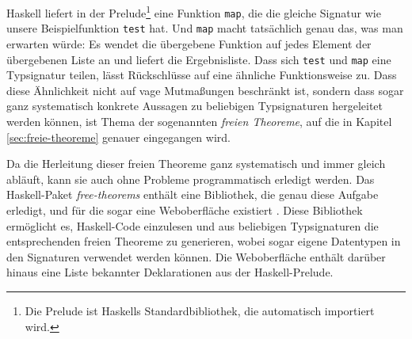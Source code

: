 Haskell liefert in der Prelude\footnote{Die Prelude ist Haskells Standardbibliothek, die automatisch importiert wird\cite{haskell}.}
eine Funktion \texttt{map}, die die gleiche Signatur wie unsere Beispielfunktion \texttt{test} hat. Und \texttt{map} macht tatsächlich genau das, was
man erwarten würde: Es wendet die übergebene Funktion auf jedes Element der übergebenen Liste an und liefert die Ergebnisliste.
Dass sich \texttt{test} und
\texttt{map} eine Typsignatur teilen, lässt Rückschlüsse auf eine ähnliche Funktionsweise zu. Dass diese Ähnlichkeit
nicht auf vage Mutmaßungen beschränkt ist, sondern dass sogar ganz systematisch konkrete Aussagen zu beliebigen Typsignaturen
hergeleitet werden können, ist Thema der sogenannten \textit{freien Theoreme}, auf die in Kapitel \ref{sec:freie-theoreme}
genauer eingegangen wird.

Da die Herleitung dieser freien Theoreme ganz systematisch und immer gleich abläuft, kann sie auch ohne Probleme
programmatisch erledigt werden. Das Haskell-Paket \textit{free-theorems} \cite{freetheorems} enthält eine Bibliothek, die
genau diese Aufgabe erledigt, und für die sogar eine Weboberfläche existiert \cite{freetheoremswebui}.
Diese Bibliothek ermöglicht es, Haskell-Code einzulesen und aus beliebigen Typsignaturen die entsprechenden freien
Theoreme zu generieren, wobei sogar eigene Datentypen in den Signaturen verwendet werden können.
Die Web\-ober\-flä\-che enthält darüber hinaus  eine Liste bekannter Deklarationen aus der Haskell-Prelude.


